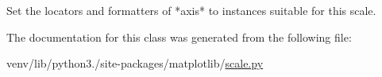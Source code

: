 \begin{DoxyVerb}Set the locators and formatters of *axis* to instances suitable for
this scale.
\end{DoxyVerb}
 

The documentation for this class was generated from the following file\+:\begin{DoxyCompactItemize}
\item 
venv/lib/python3./site-\/packages/matplotlib/\hyperlink{scale_8py}{scale.\+py}\end{DoxyCompactItemize}
